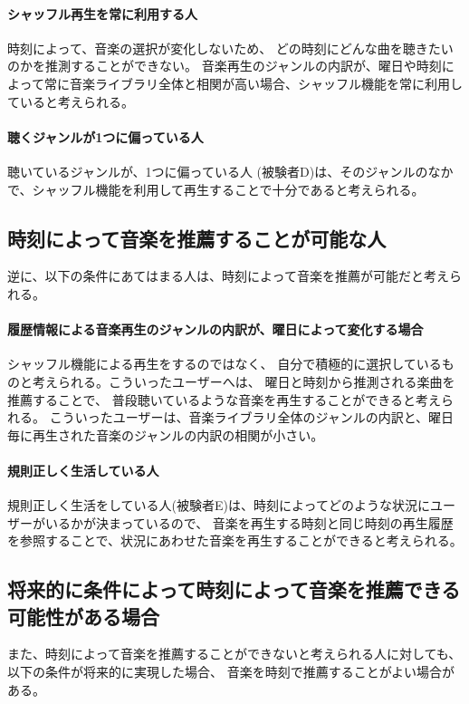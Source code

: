 \documentclass[11pt, onecolumn]{jsarticle}
\begin{document}
\paragraph{シャッフル再生を常に利用する人}
時刻によって、音楽の選択が変化しないため、
どの時刻にどんな曲を聴きたいのかを推測することができない。
音楽再生のジャンルの内訳が、曜日や時刻によって常に音楽ライブラリ全体と相関が高い場合、シャッフル機能を常に利用していると考えられる。

\paragraph{聴くジャンルが1つに偏っている人}
聴いているジャンルが、1つに偏っている人 (被験者D)は、そのジャンルのなかで、シャッフル機能を利用して再生することで十分であると考えられる。


\subsection{時刻によって音楽を推薦することが可能な人}
\par
逆に、以下の条件にあてはまる人は、時刻によって音楽を推薦が可能だと考えられる。
\paragraph{履歴情報による音楽再生のジャンルの内訳が、曜日によって変化する場合}
シャッフル機能による再生をするのではなく、
自分で積極的に選択しているものと考えられる。こういったユーザーへは、
曜日と時刻から推測される楽曲を推薦することで、
普段聴いているような音楽を再生することができると考えられる。
こういったユーザーは、音楽ライブラリ全体のジャンルの内訳と、曜日毎に再生された音楽のジャンルの内訳の相関が小さい。
\paragraph{規則正しく生活している人}
規則正しく生活をしている人(被験者E)は、時刻によってどのような状況にユーザーがいるかが決まっているので、
音楽を再生する時刻と同じ時刻の再生履歴を参照することで、状況にあわせた音楽を再生することができると考えられる。

\subsection{将来的に条件によって時刻によって音楽を推薦できる可能性がある場合}
また、時刻によって音楽を推薦することができないと考えられる人に対しても、
以下の条件が将来的に実現した場合、
音楽を時刻で推薦することがよい場合がある。
\end{document}
